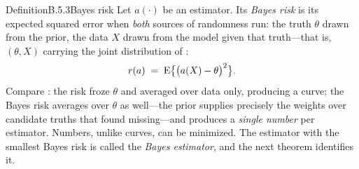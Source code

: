 \documentclass[main.tex]{subfiles}
\begin{document}
\begin{Obj}{Definition}{B.5.3}{Bayes risk}
Let $a(\cdot)$ be an estimator. Its \emph{Bayes risk} is its expected squared error when
\emph{both} sources of randomness run: the truth $\theta$ drawn from the prior, the data
$X$ drawn from the model given that truth---that is, $(\theta,X)$ carrying the joint
distribution of :
\[ r(a) \;=\; \mathrm{E}\big\{ \big( a(X) - \theta \big)^2 \big\} . \]
Compare : the risk froze $\theta$ and averaged over data only, producing a
curve; the Bayes risk averages over $\theta$ as well---the prior supplies precisely the
weights over candidate truths that  found missing---and produces a \emph{single
number} per estimator. Numbers, unlike curves, can be minimized. The estimator with the
smallest Bayes risk is called the \emph{Bayes estimator}, and the next theorem identifies
it.
\end{Obj}
\end{document}
